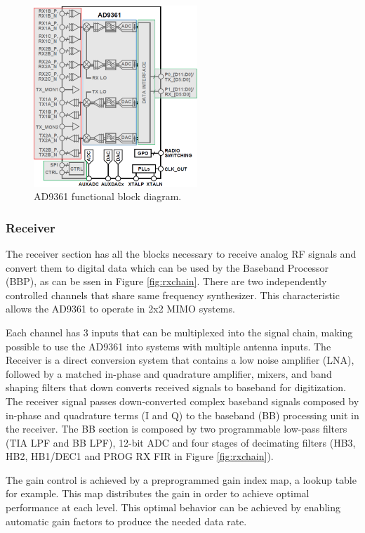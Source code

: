 \begin{figure}[htbp]
    \centering
    \includegraphics[width=0.55\textwidth]{./figures/ad9361_funcbd}
    \caption{ AD9361 functional block diagram.
    \label{fig:ad9361func}}
\end{figure}

\subsubsection{Receiver}

The receiver section has all the blocks necessary to receive analog RF signals
and convert them to digital data which can be used by the Baseband Processor
(BBP), as can be ssen in Figure \ref{fig:rxchain}. There are two independently
controlled channels that share same frequency synthesizer. This characteristic
allows the AD9361 to operate in  2x2 MIMO systems.

Each channel has 3 inputs that can be multiplexed into the signal chain, making
possible to use the AD9361 into systems with multiple antenna inputs. The
Receiver is a direct conversion system that contains a low noise amplifier
(LNA), followed by a matched in-phase and quadrature amplifier, mixers, and band
shaping filters that down converts received signals to baseband for
digitization. The
receiver signal passes down-converted complex baseband signals composed by
in-phase and quadrature terms (I and Q) to the baseband (BB) processing unit in
the receiver. The BB section is composed by two programmable low-pass filters
(TIA LPF and BB LPF), 12-bit ADC and four stages of decimating filters (HB3,
HB2, HB1/DEC1 and PROG RX FIR in Figure \ref{fig:rxchain}).

The gain control is achieved by a preprogrammed gain index map, a lookup table
for example. This map distributes the gain in order to achieve optimal
performance at each level. This optimal behavior can be achieved by enabling
automatic gain factors to produce the needed data rate.

